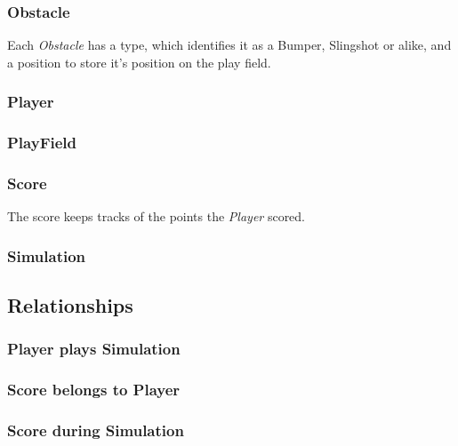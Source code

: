 \documentclass[fontsize=12pt,
               paper=a4,
               twoside=false,
               parskip=half,
               ]{scrartcl}
\begin{document}
\subsubsection{Obstacle}
Each \emph{Obstacle} has a type, which identifies it as a Bumper, Slingshot or alike, and a position to store it's position on the play field.

\subsubsection{Player}


\subsubsection{PlayField}


\subsubsection{Score}
The score keeps tracks of the points the \emph{Player} scored.

\subsubsection{Simulation}




\subsection{Relationships}

\subsubsection{Player plays Simulation}

\subsubsection{Score belongs to Player}

\subsubsection{Score during Simulation}
\end{document}
